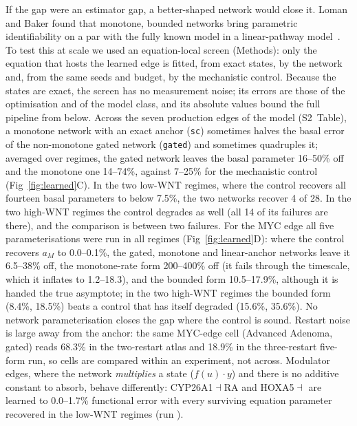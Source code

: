 If the gap were an estimator gap, a better-shaped network would close it.
Loman and Baker found that monotone, bounded networks bring parametric
identifiability on a par with the fully known model in a linear-pathway
model~\citep{loman2025identifiability}. To test this at scale we used an
equation-local screen (Methods): only the equation that hosts the learned edge
is fitted, from exact states, by the network and, from the same seeds and
budget, by the mechanistic control. Because the states are exact, the screen
has no measurement noise; its errors are those of the optimisation and of the
model class, and its absolute values bound the full pipeline from below. Across
the seven production edges of the model (S2~Table), a monotone network with an
exact anchor (\texttt{sc}) sometimes halves the basal error of the
non-monotone gated network (\texttt{gated}) and sometimes quadruples it;
averaged over regimes, the gated network leaves the basal parameter 16--50\%
off and the monotone one 14--74\%, against 7--25\% for the mechanistic control
(Fig~\ref{fig:learned}C). In the two low-WNT regimes, where the control
recovers all fourteen basal parameters to below 7.5\%, the two networks recover
4 of 28. In the two high-WNT regimes the control degrades as well (all 14 of
its failures are there), and the comparison is between two failures. For the
MYC edge all five parameterisations were run in all regimes
(Fig~\ref{fig:learned}D): where the control recovers $a_M$ to 0.0--0.1\%, the
gated, monotone and linear-anchor networks leave it 6.5--38\% off, the
monotone-rate form 200--400\% off (it fails through the timescale, which it
inflates to 1.2--18.3), and the bounded form 10.5--17.9\%, although it is handed
the true asymptote; in the two high-WNT regimes the bounded form (8.4\%,
18.5\%) beats a control that has itself degraded (15.6\%, 35.6\%). No network
parameterisation closes the gap where the control is sound. Restart noise is
large away from the anchor: the same MYC-edge cell (Advanced Adenoma, gated)
reads 68.3\% in the two-restart atlas and 18.9\% in the three-restart
five-form run, so cells are compared within an experiment, not across.
Modulator edges, where the network \emph{multiplies} a state ($f(u)\cdot y$)
and there is no additive constant to absorb, behave differently: CYP26A1$\dashv$RA
and HOXA5$\dashv$\bcat{} are learned to 0.0--1.7\% functional error with every
surviving equation parameter recovered in the low-WNT regimes (run
).

